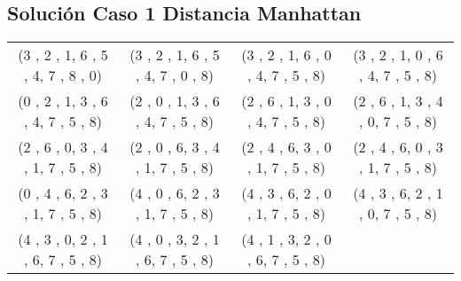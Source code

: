 \documentclass[11pt]{article}
\begin{document}
\subsection{Solución Caso 1 Distancia Manhattan}
\begin{tabular}{c c c c}
(3 , 2 , 1,
6 , 5 , 4,
7 , 8 , 0)

&

(3 , 2 , 1,
6 , 5 , 4,
7 , 0 , 8)

&

(3 , 2 , 1,
6 , 0 , 4,
7 , 5 , 8)

&


(3 , 2 , 1,
0 , 6 , 4,
7 , 5 , 8)

\\


(0 , 2 , 1,
3 , 6 , 4,
7 , 5 , 8)

&


(2 , 0 , 1,
3 , 6 , 4,
7 , 5 , 8)

&


(2 , 6 , 1,
3 , 0 , 4,
7 , 5 , 8)

&

(2 , 6 , 1,
3 , 4 , 0,
7 , 5 , 8)

\\

(2 , 6 , 0,
3 , 4 , 1,
7 , 5 , 8)

&

(2 , 0 , 6,
3 , 4 , 1,
7 , 5 , 8)

&

(2 , 4 , 6,
3 , 0 , 1,
7 , 5 , 8)

&

(2 , 4 , 6,
0 , 3 , 1,
7 , 5 , 8)

\\

(0 , 4 , 6,
2 , 3 , 1,
7 , 5 , 8)

&

(4 , 0 , 6,
2 , 3 , 1,
7 , 5 , 8)

&

(4 , 3 , 6,
2 , 0 , 1,
7 , 5 , 8)

&

(4 , 3 , 6,
2 , 1 , 0,
7 , 5 , 8)

\\

(4 , 3 , 0,
2 , 1 , 6,
7 , 5 , 8)

&

(4 , 0 , 3,
2 , 1 , 6,
7 , 5 , 8)

&

(4 , 1 , 3,
2 , 0 , 6,
7 , 5 , 8)


\end{tabular}
\end{document}
